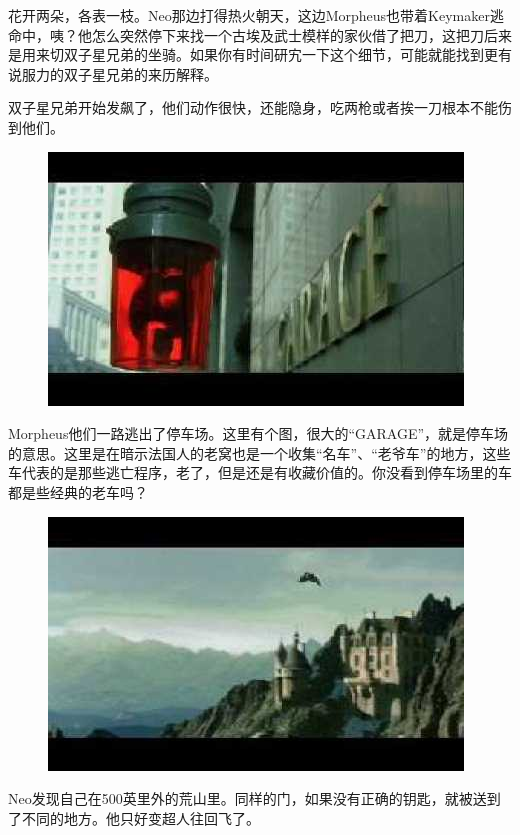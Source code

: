 \documentclass[UTF8]{ctexart}
\begin{document}
花开两朵，各表一枝。Neo那边打得热火朝天，这边Morpheus也带着Keymaker逃命中，咦？他怎么突然停下来找一个古埃及武士模样的家伙借了把刀，这把刀后来是用来切双子星兄弟的坐骑。如果你有时间研宄一下这个细节，可能就能找到更有说服力的双子星兄弟的来历解释。

双子星兄弟开始发飙了，他们动作很快，还能隐身，吃两枪或者挨一刀根本不能伤到他们。

\begin{figure}[htb]
\centering
\includegraphics[width=0.5\linewidth]{fig/read_reloaded-128}
\end{figure}

Morpheus他们一路逃出了停车场。这里有个图，很大的“GARAGE”，就是停车场的意思。这里是在暗示法国人的老窝也是一个收集“名车”、“老爷车”的地方，这些车代表的是那些逃亡程序，老了，但是还是有收藏价值的。你没看到停车场里的车都是些经典的老车吗？

\begin{figure}[htb]
\centering
\includegraphics[width=0.5\linewidth]{fig/read_reloaded-129}
\end{figure}

Neo发现自己在500英里外的荒山里。同样的门，如果没有正确的钥匙，就被送到了不同的地方。他只好变超人往回飞了。
\end{document}
